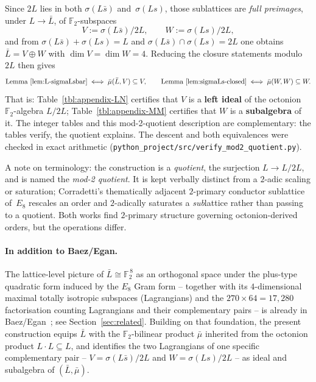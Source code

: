 \documentclass[twoside,english]{paper}
\numberwithin{equation}{section}
\numberwithin{figure}{section}
\theoremstyle{definition}
\theoremstyle{remark}
\newcommand{\FF}{\mathbb{F}}
\begin{document}
Since $2L$ lies in both $\sigma(L\bar s)$ and~$\sigma(Ls)$, those
sublattices are \emph{full preimages}, under $L \to \bar L$, of
$\FF_2$-subspaces
\[
  V := \sigma(L\bar s)/2L, \qquad W := \sigma(Ls)/2L,
\]
and from $\sigma(L\bar s) + \sigma(Ls) = L$ and
$\sigma(L\bar s) \cap \sigma(Ls) = 2L$ one obtains $\bar L = V \oplus
W$ with $\dim V = \dim W = 4$.  Reducing the closure statements
modulo~$2L$ then gives
\[
  \text{Lemma~\ref{lem:L-sigmaLsbar}} \iff
    \bar\mu(\bar L, V) \subseteq V, \qquad
  \text{Lemma~\ref{lem:sigmaLs-closed}} \iff
    \bar\mu(W, W) \subseteq W.
\]
That is: Table~\ref{tbl:appendix-LN} certifies that $V$ is a
\textbf{left ideal} of the octonion $\FF_2$-algebra $L/2L$;
Table~\ref{tbl:appendix-MM} certifies that $W$ is a
\textbf{subalgebra} of it.  The integer tables and this mod-2-quotient
description are complementary: the tables verify, the quotient
explains.  The descent and both equivalences were checked in exact
arithmetic
(\texttt{python\_project/src/verify\_mod2\_quotient.py}).

A note on terminology: the construction is a \emph{quotient}, the
surjection $L \to L/2L$, and is named the \emph{mod-2 quotient}.  It
is kept verbally distinct from a $2$-adic scaling or saturation;
Corradetti's \cite{Corradetti2026} thematically adjacent $2$-primary
conductor sublattice of~$E_8$ rescales an order and $2$-adically
saturates a \emph{sub}lattice rather than passing to a quotient.
Both works find $2$-primary structure governing octonion-derived
orders, but the operations differ.

\paragraph{In addition to Baez/Egan.}
The lattice-level picture of $\bar L \cong \FF_2^{\,8}$ as an
orthogonal space under the plus-type quadratic form induced by the
$E_8$ Gram form -- together with its $4$-dimensional maximal
totally isotropic subspaces (Lagrangians) and the $270 \times 64 =
17{,}280$ factorisation counting Lagrangians and their
complementary pairs -- is already in Baez/Egan~\cite{Baez2014};
see Section~\ref{sec:related}.  Building on that foundation, the
present construction equips $\bar L$ with the $\FF_2$-bilinear
product $\bar\mu$ inherited from the octonion product
$L \cdot L \subseteq L$, and identifies the two Lagrangians of one
specific complementary pair -- $V = \sigma(L\bar s)/2L$ and
$W = \sigma(Ls)/2L$ -- as ideal and subalgebra of
$(\bar L, \bar\mu)$.
\end{document}
